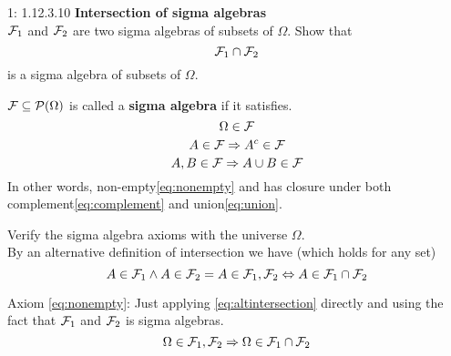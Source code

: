 \documentclass[a4paper,twoside=false,abstract=false,numbers=noenddot,
titlepage=false,headings=small,parskip=half,version=last]{scrartcl}
\begin{document}


\begin{exercise}{1: 1.12.3.10} {\bf Intersection of sigma algebras}   \\
    $\mathcal{F}_1$ and $\mathcal{F}_2$ are two sigma algebras of subsets of $\Omega$. Show
    that
    \begin{equation}
        \mathcal{F}_1 \cap \mathcal{F}_2
    \end{equation}
    is a sigma algebra of subsets of $\Omega$.
\end{exercise}
\begin{solution}
    \begin{definition}
        $\mathcal{F} \subseteq \mathcal{P}(\Omega)$ is called a \textbf{sigma
        algebra} if it satisfies.
        \begin{equation}
            \label{eq:nonempty}
            \Omega \in \mathcal{F}
        \end{equation}
        \begin{equation}
            \label{eq:complement}
            A\in \mathcal{F} \Rightarrow A^c \in \mathcal{F}
        \end{equation}
        \begin{equation}
            \label{eq:union}
            A, B\in \mathcal{F} \Rightarrow A\cup B \in \mathcal{F}
        \end{equation}
        In other words, non-empty\eqref{eq:nonempty} and has closure under both
        complement\eqref{eq:complement} and union\eqref{eq:union}.
    \end{definition}

    Verify the sigma algebra axioms with the universe $\Omega$.\\

    By an alternative definition of intersection we have (which holds for any
    set)
    \begin{equation}
        \label{eq:altintersection}
        A \in \mathcal{F}_1\wedge A \in \mathcal{F}_2 = A \in \mathcal{F}_1, \mathcal{F}_2 \Leftrightarrow A \in \mathcal{F}_1 \cap \mathcal{F}_2
    \end{equation}

    Axiom \ref{eq:nonempty}:
    Just applying \eqref{eq:altintersection} directly and using the fact that
    $\mathcal{F}_1$ and $\mathcal{F}_2$ is sigma algebras.
    \begin{equation}
        \Omega \in \mathcal{F}_1, \mathcal{F}_2 \Rightarrow \Omega \in \mathcal{F}_1 \cap \mathcal{F}_2
    \end{equation}


\end{solution}
\end{document}
